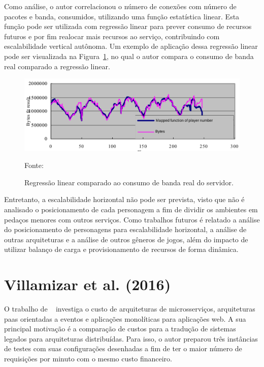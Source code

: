 \vspace{-0.3cm}
Como análise, o autor correlacionou o número de conexões com número de pacotes e banda, consumidos, utilizando uma função estatística linear.
%
Esta função pode ser utilizada com regressão linear para prever consumo de recursos futuros e por fim realocar mais recursos ao serviço, contribuindo com escalabilidade vertical autônoma.
%
Um exemplo de aplicação dessa regressão linear pode ser visualizada na Figura~\ref{fig:regressao_bytes}, no qual o autor compara o consumo de banda real comparado a regressão linear.


\vspace{-0.2cm}
\begin{figure}[htb!]
\caption{Regressão linear comparado ao consumo de banda real do servidor.}
\vspace{-0.4cm}
\label{fig:regressao_bytes}
\includegraphics[width=.6\textwidth]{img/cap2/regressao.png}
\centering

Fonte:~\cite{1417630}
\end{figure}



Entretanto, a escalabilidade horizontal não pode ser prevista, visto que não é analisado o posicionamento de cada personagem a fim de dividir os ambientes em pedaços menores com outros serviços.
%
Como trabalhos futuros é relatado a análise do posicionamento de personagens para escalabilidade horizontal, a análise de outras arquiteturas e a análise de outros gêneros de jogos, além do impacto de utilizar balanço de carga e provisionamento de recursos de forma dinâmica.



\section{Villamizar et al. (2016)}



O trabalho de ~\cite{7515686} investiga o custo de arquiteturas de microsserviços, arquiteturas \ac{paas} orientadas a eventos e aplicações monolíticas para aplicações web.
%
A sua principal motivação é a comparação de custos para a tradução de sistemas legados para arquiteturas distribuídas.
%
Para isso, o autor preparou três instâncias de testes com suas configurações desenhadas a fim de ter o maior número de requisições por minuto com o mesmo custo financeiro.





